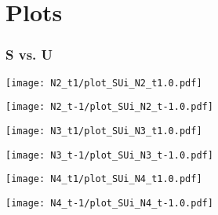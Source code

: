 \documentclass{beamer}
\begin{document}
\section{Plots}
\begin{frame}\frametitle{S vs. U}
\begin{center}
		\begin{minipage}[t]{0.44\textwidth}
		\texttt{[image: N2\_t1/plot\_SUi\_N2\_t1.0.pdf]}
	\end{minipage}
	\begin{minipage}[t]{0.44\textwidth}
		\texttt{[image: N2\_t-1/plot\_SUi\_N2\_t-1.0.pdf]}
	\end{minipage}

	\begin{minipage}[t]{0.44\textwidth}
	\texttt{[image: N3\_t1/plot\_SUi\_N3\_t1.0.pdf]}
	\end{minipage}
	\begin{minipage}[t]{0.44\textwidth}
		\texttt{[image: N3\_t-1/plot\_SUi\_N3\_t-1.0.pdf]}
	\end{minipage}

	\begin{minipage}[t]{0.44\textwidth}
	\texttt{[image: N4\_t1/plot\_SUi\_N4\_t1.0.pdf]}
	\end{minipage}
	\begin{minipage}[t]{0.44\textwidth}
		\texttt{[image: N4\_t-1/plot\_SUi\_N4\_t-1.0.pdf]}
	\end{minipage}
\end{center}	
\end{frame}
\end{document}
